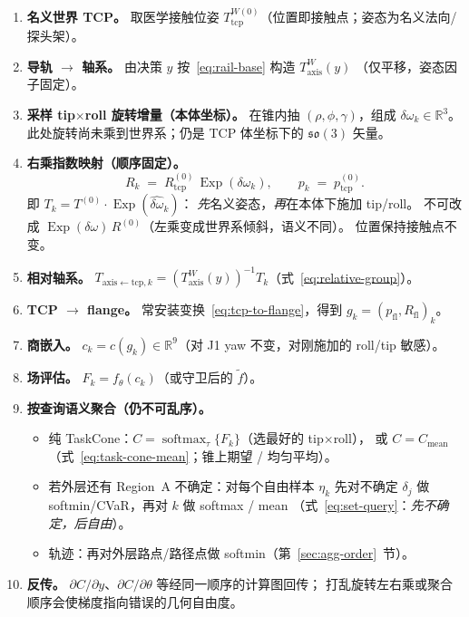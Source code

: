 \documentclass[UTF8,a4paper,11pt,fontset=fandol]{ctexart}
\newcommand{\R}{\mathbb{R}}
\newcommand{\Taxis}{T_{\mathrm{axis}}}
\newcommand{\softmax}{\operatorname{softmax}}
\begin{document}
\begin{enumerate}[leftmargin=1.6em]
  \item \textbf{名义世界 TCP。}
        取医学接触位姿 \(T_{\mathrm{tcp}}^{W(0)}\)（位置即接触点；姿态为名义法向/探头架）。
  \item \textbf{导轨 \(\to\) 轴系。}
        由决策 \(y\) 按~\eqref{eq:rail-base} 构造 \(\Taxis^{W}(y)\)
        （仅平移，姿态因子固定）。
  \item \textbf{采样 tip$\times$roll 旋转增量（本体坐标）。}
        在锥内抽 \((\rho,\phi,\gamma)\)，组成 \(\delta\omega_{k}\in\R^{3}\)。
        此处旋转尚未乘到世界系；仍是 TCP 体坐标下的 \(\mathfrak{so}(3)\) 矢量。
  \item \textbf{右乘指数映射（顺序固定）。}
        \[
          R_{k}
          \;=\;
          R_{\mathrm{tcp}}^{(0)}\,
          \operatorname{Exp}(\delta\omega_{k}),
          \qquad
          p_{k}
          \;=\;
          p_{\mathrm{tcp}}^{(0)}.
        \]
        即 \(T_{k}=T^{(0)}\cdot\operatorname{Exp}(\widehat{\delta\omega}_{k})\)：
        \emph{先}名义姿态，\emph{再}在本体下施加 tip/roll。
        不可改成 \(\operatorname{Exp}(\delta\omega)\,R^{(0)}\)（左乘变成世界系倾斜，语义不同）。
        位置保持接触点不变。
  \item \textbf{相对轴系。}
        \(T_{\mathrm{axis\leftarrow tcp},k}
        =(\Taxis^{W}(y))^{-1}T_{k}\)（式~\eqref{eq:relative-group}）。
  \item \textbf{TCP \(\to\) flange。}
        常安装变换~\eqref{eq:tcp-to-flange}，得到 \(g_{k}=(p_{\mathrm{fl}},R_{\mathrm{fl}})_{k}\)。
  \item \textbf{商嵌入。}
        \(c_{k}=c(g_{k})\in\R^{9}\)（对 J1 yaw 不变，对刚施加的 roll/tip 敏感）。
  \item \textbf{场评估。}
        \(F_{k}=f_{\theta}(c_{k})\)（或守卫后的 \(\tilde f\)）。
  \item \textbf{按查询语义聚合（仍不可乱序）。}
        \begin{itemize}[leftmargin=1.2em]
          \item 纯 TaskCone：\(C=\softmax_{\tau}\{F_{k}\}\)（选最好的 tip$\times$roll），
                或 \(C=C_{\mathrm{mean}}\)（式~\eqref{eq:task-cone-mean}；锥上期望 / 均匀平均）。
          \item 若外层还有 Region~A 不确定：对每个自由样本 \(\eta_{k}\) 先对不确定
                \(\delta_{j}\) 做 softmin/CVaR，再对 \(k\) 做 softmax / mean
                （式~\eqref{eq:set-query}：\emph{先不确定，后自由}）。
          \item 轨迹：再对外层路点/路径点做 softmin（第~\ref{sec:agg-order}~节）。
        \end{itemize}
  \item \textbf{反传。}
        \(\partial C/\partial y\)、\(\partial C/\partial\theta\) 等经同一顺序的计算图回传；
        打乱旋转左右乘或聚合顺序会使梯度指向错误的几何自由度。
\end{enumerate}
\end{document}
